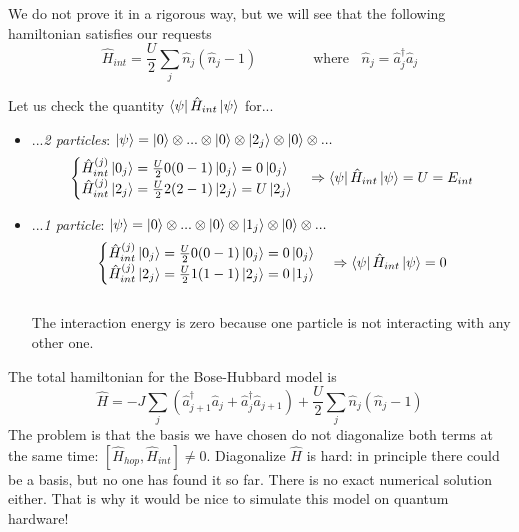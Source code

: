 We do not prove it in a rigorous way, but we will see that the following hamiltonian  satisfies our requests
\begin{equation*}
    \hat{H}_{int} = \frac{U}{2}\sum_j \hat{n}_j (\hat{n}_j-1)  \qquad\qquad \text{where }\;\; \hat{n}_j = \hat{a}_j^\dag \hat{a}_j
\end{equation*}

\noindent Let us check the quantity $\bra{\psi}\hat{H}_{int}\ket{\psi}$ for...
\begin{itemize}
    \item ...\emph{2 particles}: $\ket{\psi} = \ket{0}\otimes ...\otimes\ket{0}\otimes\ket{2_j}\otimes\ket{0}\otimes ...$\\
    $$\begin{cases}
        \hat{H}_{int}^{(j)} \ket{0_j} = \frac{U}{2}0(0-1)\ket{0_j} = 0\ket{0_j}\\
        \hat{H}_{int}^{(j)} \ket{2_j} = \frac{U}{2}2(2-1)\ket{2_j} = U\ket{2_j}
    \end{cases} \Rightarrow \bra{\psi}\hat{H}_{int}\ket{\psi} = U = E_{int}$$
    \item ...\emph{1 particle}: $\ket{\psi} = \ket{0}\otimes ...\otimes\ket{0}\otimes\ket{1_j}\otimes\ket{0}\otimes ...$\\
    \begin{equation}
    \label{eq:bh-interaction-min}
    \begin{cases}
        \hat{H}_{int}^{(j)} \ket{0_j} = \frac{U}{2}0(0-1) \ket{0_j} = 0\ket{0_j}\\
        \hat{H}_{int}^{(j)} \ket{2_j} = \frac{U}{2}1(1-1) \ket{2_j} = 0\ket{1_j}
    \end{cases}
    \Rightarrow  \bra{\psi}\hat{H}_{int}\ket{\psi} = 0
    \end{equation}\\
    The interaction energy is zero because one particle is not interacting with any other one.
\end{itemize}


The total hamiltonian for the Bose-Hubbard model is
\begin{equation}
    \hat{H} = -J\sum_j\left(
        \hat{a}_{j+1}^\dag\hat{a}_{j} + \hat{a}_{j}^\dag\hat{a}_{j+1}
    \right) + \frac{U}{2} \sum_j \hat{n}_{j}(\hat{n}_{j}-1)
\end{equation}
%
The problem is that the basis we have chosen do not diagonalize both terms at the same time: $\left[\hat{H}_{hop}, \hat{H}_{int}\right] \neq 0$. Diagonalize $\hat{H}$ is hard: in principle there could be a basis, but no one has found it so far. There is no exact numerical solution either. That is why it would be nice to simulate this model on quantum hardware!\\

